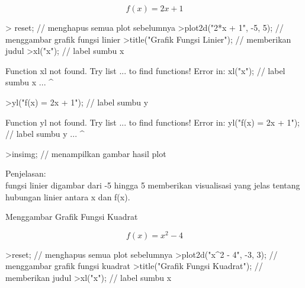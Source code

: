 \documentclass{article}
\begin{document}
\begin{eulernotebook}
\begin{eulercomment}
\begin{eulercomment}
\begin{eulercomment}
\begin{eulercomment}
\begin{eulercomment}
\begin{eulercomment}
\begin{eulercomment}
\begin{eulercomment}
\begin{eulercomment}
\end{eulercomment}
\begin{eulerformula}
\[
f(x)=2x+1
\]
\end{eulerformula}
\begin{eulercomment}
\end{eulercomment}
\begin{eulerprompt}
> reset; // menghapus semua plot sebelumnya
>plot2d("2*x + 1", -5, 5); // menggambar grafik fungsi linier
>title("Grafik Fungsi Linier"); // memberikan judul
>xl("x"); // label sumbu x
\end{eulerprompt}
\begin{euleroutput}
  Function xl not found.
  Try list ... to find functions!
  Error in:
  xl("x"); // label sumbu x ...
         ^
\end{euleroutput}
\begin{eulerprompt}
>yl("f(x) = 2x + 1"); // label sumbu y
\end{eulerprompt}
\begin{euleroutput}
  Function yl not found.
  Try list ... to find functions!
  Error in:
  yl("f(x) = 2x + 1"); // label sumbu y ...
                     ^
\end{euleroutput}
\begin{eulerprompt}
>insimg; // menampilkan gambar hasil plot
\end{eulerprompt}
\begin{eulercomment}
Penjelasan:\\
fungsi linier digambar dari -5 hingga 5 memberikan visualisasi yang
jelas tentang hubungan linier antara x dan f(x).\\
\end{eulercomment}
\eulersubheading{}
\begin{eulercomment}
Menggambar Grafik Fungsi Kuadrat\\
\end{eulercomment}
\begin{eulerformula}
\[
f(x)=x^2-4
\]
\end{eulerformula}
\begin{eulerprompt}
>reset; // menghapus semua plot sebelumnya
>plot2d("x^2 - 4", -3, 3); // menggambar grafik fungsi kuadrat
>title("Grafik Fungsi Kuadrat"); // memberikan judul
>xl("x"); // label sumbu x
\end{eulerprompt}
\begin{euleroutput}

\end{euleroutput}
\end{eulercomment}
\end{eulercomment}
\end{eulercomment}
\end{eulercomment}
\end{eulercomment}
\end{eulercomment}
\end{eulercomment}
\end{eulercomment}
\end{eulernotebook}
\end{document}
